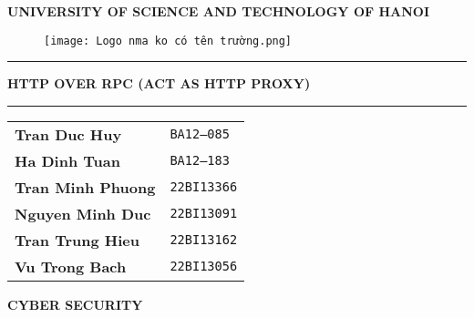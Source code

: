 \documentclass{article}
\begin{document}
\begin{center}
    \vspace{12pt} %
        \textbf{\fontsize{13pt}{0pt} \selectfont{} UNIVERSITY OF SCIENCE AND TECHNOLOGY OF HANOI}
    \vspace{0.5cm}

\begin{figure}[H]
    \centering
    \texttt{[image: Logo nma ko có tên trường.png]}
\end{figure}

\vspace{35pt}
\vspace{20pt}

\vspace{18pt}

    \noindent %
    \rule{\textwidth}{0.5pt} %
    \vspace{0.01em} %
    \begin{center} %
    \textbf{HTTP OVER RPC (ACT AS HTTP PROXY)}
    \end{center}
    \vspace{0.01em} %
    \rule{\textwidth}{0.5pt} %

\vspace{18pt}
    
\noindent
\begin{tabular}{l l}
\textbf{Tran Duc Huy}       & \texttt{BA12--085}  \\
\textbf{Ha Dinh Tuan}       & \texttt{BA12--183}  \\
\textbf{Tran Minh Phuong}   & \texttt{22BI13366}  \\
\textbf{Nguyen Minh Duc}    & \texttt{22BI13091}   \\
\textbf{Tran Trung Hieu}    & \texttt{22BI13162}  \\
\textbf{Vu Trong Bach}      & \texttt{22BI13056}  \\
\end{tabular}

    \vspace{15pt}

        \fontsize{14pt}{0pt}\selectfont{} \textbf{CYBER SECURITY} 

\end{center}
    \vspace{5pt}
\end{document}
